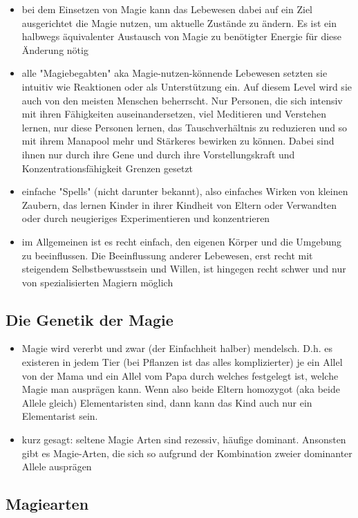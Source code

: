 \begin{itemize}
	\item bei dem Einsetzen von Magie kann das Lebewesen dabei auf ein Ziel ausgerichtet die Magie nutzen, um aktuelle Zustände zu ändern. Es ist ein halbwegs äquivalenter Austausch von Magie zu benötigter Energie für diese Änderung nötig
	\item alle "Magiebegabten" aka Magie-nutzen-könnende Lebewesen setzten sie intuitiv wie Reaktionen oder als Unterstützung ein. Auf diesem Level wird sie auch von den meisten Menschen beherrscht. Nur Personen, die sich intensiv mit ihren Fähigkeiten auseinandersetzen, viel Meditieren und Verstehen lernen, nur diese Personen lernen, das Tauschverhältnis zu reduzieren und so mit ihrem Manapool mehr und Stärkeres bewirken zu können. Dabei sind ihnen nur durch ihre Gene und durch ihre Vorstellungskraft und Konzentrationsfähigkeit Grenzen gesetzt
	\item einfache "Spells" (nicht darunter bekannt), also einfaches Wirken  von kleinen Zaubern, das lernen Kinder in ihrer Kindheit von Eltern oder Verwandten oder durch neugieriges Experimentieren und konzentrieren
	\item im Allgemeinen ist es recht einfach, den eigenen Körper und die Umgebung zu beeinflussen. Die Beeinflussung anderer Lebewesen, erst recht mit steigendem Selbstbewusstsein und Willen, ist hingegen recht schwer und nur von spezialisierten Magiern möglich
\end{itemize}


\subsection{Die Genetik der Magie}
\begin{itemize}
	\item Magie wird vererbt und zwar (der Einfachheit halber) mendelsch. D.h. es existeren in jedem Tier (bei Pflanzen ist das alles komplizierter) je ein Allel von der Mama und ein Allel vom Papa durch welches festgelegt ist, welche Magie man ausprägen kann. Wenn also beide Eltern homozygot (aka beide Allele gleich) Elementaristen sind, dann kann das Kind auch nur ein Elementarist sein.
	\item kurz gesagt: seltene Magie Arten sind rezessiv, häufige dominant. Ansonsten gibt es Magie-Arten, die sich so aufgrund der Kombination zweier dominanter Allele ausprägen
\end{itemize}

\subsection{Magiearten}
